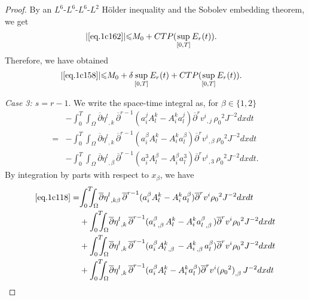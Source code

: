\documentclass[12pt,twoside,reqno]{amsart}
\numberwithin{equation}{section}
\theoremstyle{definition}
\theoremstyle{remark}
\begin{document}
\begin{proof}
By an $L^6$-$L^6$-$L^6$-$L^2$ H\"older inequality and the Sobolev embedding theorem, we get
\begin{align*}
  {\vert{\eqref{eq.1c162}}\vert} {\leqslant}& M_0+CTP(\sup_{[0,T]}E_r(t)).
\end{align*}
Therefore, we have obtained
\begin{align*}
  {\vert{\eqref{eq.1c158}}\vert} {\leqslant}& M_0+\delta\sup_{[0,T]}E_r(t)+CTP(\sup_{[0,T]}E_r(t)).
\end{align*}

\emph{Case 3: $s=r-1$}. We write the space-time integral as, for $\beta\in\{1,2\}$
\begin{align}
  &-{\int_0^T\!\!\!\!\int_\Omega }  {\overline{\partial}} {{{\eta^l}}_{,{k}}\,}{\overline{\partial}}^{r-1}(a^j_iA^k_l-A^k_ia^j_l){{{{\overline{\partial}}^r v^i}}_{,{j}}\,}{\rho_0}^2  J^{-2}dxdt\label{eq.1c117}\\
  =&-{\int_0^T\!\!\!\!\int_\Omega }  {\overline{\partial}} {{{\eta^l}}_{,{k}}\,}{\overline{\partial}}^{r-1}(a^\beta_iA^k_l-A^k_ia^\beta_l){{{{\overline{\partial}}^r v^i}}_{,{\beta}}\,}{\rho_0}^2  J^{-2}dxdt\label{eq.1c118}\\
  &-{\int_0^T\!\!\!\!\int_\Omega }  {\overline{\partial}} {{{\eta^l}}_{,{\beta}}\,}{\overline{\partial}}^{r-1}(a^3_iA^\beta_l-A^\beta_ia^3_l){{{{\overline{\partial}}^r v^i}}_{,{3}}\,}{\rho_0}^2  J^{-2}dxdt.\label{eq.1c119}
\end{align}
By integration by parts with respect to $x_\beta$, we have
\begin{align}
  \eqref{eq.1c118}=&{\int_0^T\!\!\!\!\int_\Omega }  {\overline{\partial}} {{{\eta^l}}_{,{k\beta}}\,}{\overline{\partial}}^{r-1}(a^\beta_iA^k_l-A^k_ia^\beta_l){\overline{\partial}}^r v^i{\rho_0}^2  J^{-2}dxdt\label{eq.1c120}\\
  &+{\int_0^T\!\!\!\!\int_\Omega }  {\overline{\partial}} {{{\eta^l}}_{,{k}}\,}{\overline{\partial}}^{r-1}({{{a^\beta_i}}_{,{\beta}}\,}A^k_l-A^k_i{{{a^\beta_l}}_{,{\beta}}\,}){\overline{\partial}}^r v^i{\rho_0}^2  J^{-2}dxdt\label{eq.1c121}\\
  &+{\int_0^T\!\!\!\!\int_\Omega }  {\overline{\partial}} {{{\eta^l}}_{,{k}}\,}{\overline{\partial}}^{r-1}(a^\beta_i {{{A^k_l}}_{,{\beta}}\,}-{{{A^k_i}}_{,{\beta}}\,}a^\beta_l){\overline{\partial}}^r v^i{\rho_0}^2  J^{-2}dxdt\label{eq.1c122}\\
  &+{\int_0^T\!\!\!\!\int_\Omega }  {\overline{\partial}} {{{\eta^l}}_{,{k}}\,}{\overline{\partial}}^{r-1}(a^\beta_iA^k_l-A^k_ia^\beta_l){\overline{\partial}}^r v^i{{{({\rho_0}^2)}}_{,{\beta}}\,} J^{-2}dxdt\label{eq.1c123}\\

\end{align}
\end{proof}
\end{document}
